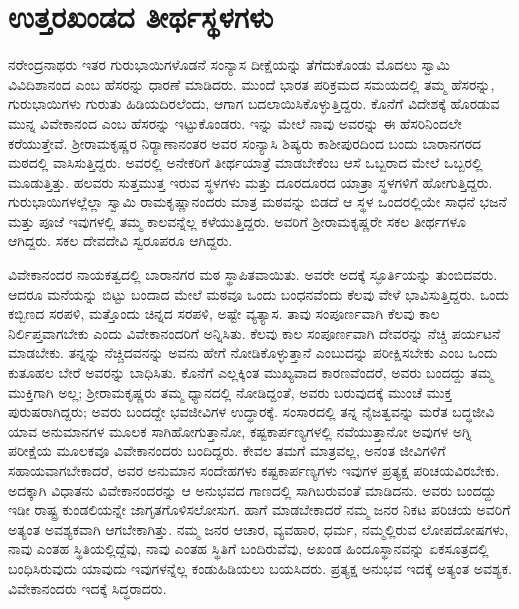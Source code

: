 
\chapter{ಉತ್ತರಖಂಡದ ತೀರ್ಥಸ್ಥಳಗಳು}

ನರೇಂದ್ರನಾಥರು ಇತರ ಗುರುಭಾಯಿಗಳೊಡನೆ ಸಂನ್ಯಾಸ ದೀಕ್ಷೆಯನ್ನು ತೆಗೆದುಕೊಂಡು ಮೊದಲು ಸ್ವಾಮಿ ವಿವಿದಿಶಾನಂದ ಎಂಬ ಹೆಸರನ್ನು ಧಾರಣೆ ಮಾಡಿದರು. ಮುಂದೆ ಭಾರತ ಪರಿಕ್ರಮದ ಸಮಯದಲ್ಲಿ ತಮ್ಮ ಹೆಸರನ್ನು, ಗುರುಭಾಯಿಗಳು ಗುರುತು ಹಿಡಿಯದಿರಲೆಂದು, ಆಗಾಗ ಬದಲಾಯಿಸಿಕೊಳ್ಳುತ್ತಿದ್ದರು. ಕೊನೆಗೆ ವಿದೇಶಕ್ಕೆ ಹೊರಡುವ ಮುನ್ನ ವಿವೇಕಾನಂದ ಎಂಬ ಹೆಸರನ್ನು ಇಟ್ಟುಕೊಂಡರು. ಇನ್ನು ಮೇಲೆ ನಾವು ಅವರನ್ನು ಈ ಹೆಸರಿನಿಂದಲೇ ಕರೆಯುತ್ತೇವೆ. ಶ‍್ರೀರಾಮಕೃಷ್ಣರ ನಿರ‍್ಯಾಣಾನಂತರ ಅವರ ಸಂನ್ಯಾಸಿ ಶಿಷ್ಯರು ಕಾಶೀಪುರದಿಂದ ಬಂದು ಬಾರಾನಗರದ ಮಠದಲ್ಲಿ ವಾಸಿಸುತ್ತಿದ್ದರು. ಅವರಲ್ಲಿ ಅನೇಕರಿಗೆ ತೀರ್ಥಯಾತ್ರೆ ಮಾಡಬೇಕೆಂಬ ಆಸೆ ಒಬ್ಬರಾದ ಮೇಲೆ ಒಬ್ಬರಲ್ಲಿ ಮೂಡುತ್ತಿತ್ತು. ಹಲವರು ಸುತ್ತಮುತ್ತ ಇರುವ ಸ್ಥಳಗಳು ಮತ್ತು ದೂರದೂರದ ಯಾತ್ರಾ ಸ್ಥಳಗಳಿಗೆ ಹೋಗುತ್ತಿದ್ದರು. ಗುರುಭಾಯಿಗಳಲ್ಲೆಲ್ಲಾ ಸ್ವಾಮಿ ರಾಮಕೃಷ್ಣಾನಂದರು ಮಾತ್ರ ಮಠವನ್ನು ಬಿಡದೆ ಆ ಸ್ಥಳ ಒಂದರಲ್ಲಿಯೇ ಸಾಧನೆ ಭಜನೆ ಮತ್ತು ಪೂಜೆ ಇವುಗಳಲ್ಲಿ ತಮ್ಮ ಕಾಲವನ್ನೆಲ್ಲ ಕಳೆಯುತ್ತಿದ್ದರು. ಅವರಿಗೆ ಶ‍್ರೀರಾಮಕೃಷ್ಣರೇ ಸಕಲ ತೀರ್ಥಗಳೂ ಆಗಿದ್ದರು. ಸಕಲ ದೇವದೇವಿ ಸ್ವರೂಪರೂ ಆಗಿದ್ದರು.

ವಿವೇಕಾನಂದರ ನಾಯಕತ್ವದಲ್ಲಿ ಬಾರಾನಗರ ಮಠ ಸ್ಥಾಪಿತವಾಯಿತು. ಅವರೇ ಅದಕ್ಕೆ ಸ್ಫೂರ್ತಿಯನ್ನು ತುಂಬಿದವರು. ಆದರೂ ಮನೆಯನ್ನು ಬಿಟ್ಟು ಬಂದಾದ ಮೇಲೆ ಮಠವೂ ಒಂದು ಬಂಧನವೆಂದು ಕೆಲವು ವೇಳೆ ಭಾವಿಸುತ್ತಿದ್ದರು. ಒಂದು ಕಬ್ಬಿಣದ ಸರಪಳಿ, ಮತ್ತೊಂದು ಚಿನ್ನದ ಸರಪಳಿ, ಅಷ್ಟೇ ವ್ಯತ್ಯಾಸ. ತಾವು ಸಂಪೂರ್ಣವಾಗಿ ಕೆಲವು ಕಾಲ ನಿರ್ಲಿಪ್ತವಾಗಬೇಕು ಎಂದು ವಿವೇಕಾನಂದರಿಗೆ ಅನ್ನಿಸಿತು. ಕೆಲವು ಕಾಲ ಸಂಪೂರ್ಣವಾಗಿ ದೇವರನ್ನು ನೆಚ್ಚಿ ಪರ್ಯಟನೆ ಮಾಡಬೇಕು. ತನ್ನನ್ನು ನೆಚ್ಚಿದವನನ್ನು ಅವನು ಹೇಗೆ ನೋಡಿಕೊಳ್ಳುತ್ತಾನೆ ಎಂಬುದನ್ನು ಪರೀಕ್ಷಿಸಬೇಕು ಎಂಬ ಒಂದು ಕುತೂಹಲ ಬೇರೆ ಅವರನ್ನು ಬಾಧಿಸಿತು. ಕೊನೆಗೆ ಎಲ್ಲಕ್ಕಿಂತ ಮುಖ್ಯವಾದ ಕಾರಣವೆಂದರೆ, ಅವರು ಬಂದದ್ದು ತಮ್ಮ ಮುಕ್ತಿಗಾಗಿ ಅಲ್ಲ; ಶ‍್ರೀರಾಮಕೃಷ್ಣರು ತಮ್ಮ ಧ್ಯಾನದಲ್ಲಿ ನೋಡಿದ್ದಂತೆ, ಅವರು ಬರುವುದಕ್ಕೆ ಮುಂಚೆ ಮುಕ್ತ ಪುರುಷರಾಗಿದ್ದರು; ಅವರು ಬಂದದ್ದೇ ಭವಜೀವಿಗಳ ಉದ್ಧಾರಕ್ಕೆ. ಸಂಸಾರದಲ್ಲಿ ತನ್ನ ನೈಜತ್ವವನ್ನು ಮರೆತ ಬದ್ಧಜೀವಿ ಯಾವ ಅನುಮಾನಗಳ ಮೂಲಕ ಸಾಗಿಹೋಗುತ್ತಾನೋ, ಕಷ್ಟಕಾರ್ಪಣ್ಯಗಳಲ್ಲಿ ನವೆಯುತ್ತಾನೋ ಅವುಗಳ ಅಗ್ನಿ ಪರೀಕ್ಷೆಯ ಮೂಲಕವೂ ವಿವೇಕಾನಂದರು ಬಂದಿದ್ದರು. ಕೇವಲ ತಮಗೆ ಮಾತ್ರವಲ್ಲ, ಅನಂತ ಜೀವಿಗಳಿಗೆ ಸಹಾಯವಾಗಬೇಕಾದರೆ, ಅವರ ಅನುಮಾನ ಸಂದೇಹಗಳು ಕಷ್ಟಕಾರ್ಪಣ್ಯಗಳು ಇವುಗಳ ಪ್ರತ್ಯಕ್ಷ ಪರಿಚಯವಿರಬೇಕು. ಅದಕ್ಕಾಗಿ ವಿಧಾತನು ವಿವೇಕಾನಂದರನ್ನು ಆ ಅನುಭವದ ಗಾಣದಲ್ಲಿ ಸಾಗಿಬರುವಂತೆ ಮಾಡಿದನು. ಅವರು ಬಂದದ್ದು ಇಡೀ ರಾಷ್ಟ್ರ ಕುಂಡಲಿಯನ್ನೇ ಜಾಗೃತಗೊಳಿಸಲೋಸುಗ. ಹಾಗೆ ಮಾಡಬೇಕಾದರೆ ನಮ್ಮ ಜನರ ನಿಕಟ ಪರಿಚಯ ಅವರಿಗೆ ಅತ್ಯಂತ ಅವಶ್ಯಕವಾಗಿ ಆಗಬೇಕಾಗಿತ್ತು. ನಮ್ಮ ಜನರ ಆಚಾರ, ವ್ಯವಹಾರ, ಧರ್ಮ, ನಮ್ಮಲ್ಲಿರುವ ಲೋಪದೋಷಗಳು, ನಾವು ಎಂತಹ ಸ್ಥಿತಿಯಲ್ಲಿದ್ದೆವು, ನಾವು ಎಂತಹ ಸ್ಥಿತಿಗೆ ಬಂದಿರುವೆವು, ಅಖಂಡ ಹಿಂದೂಸ್ಥಾನವನ್ನು ಏಕಸೂತ್ರದಲ್ಲಿ ಬಂಧಿಸಿರುವುದು ಯಾವುದು ಇವುಗಳನ್ನೆಲ್ಲ ಕಂಡುಹಿಡಿಯಲು ಬಯಸಿದರು. ಪ್ರತ್ಯಕ್ಷ ಅನುಭವ ಇದಕ್ಕೆ ಅತ್ಯಂತ ಅವಶ್ಯಕ. ವಿವೇಕಾನಂದರು ಇದಕ್ಕೆ ಸಿದ್ಧರಾದರು.

